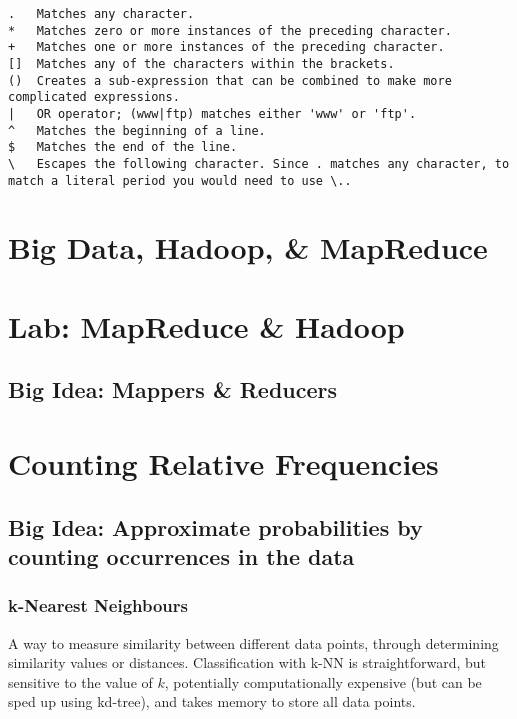 \documentclass[9pt,twocolumn]{article}
\begin{document}
\begin{lstlisting}
.   Matches any character.
*   Matches zero or more instances of the preceding character.
+   Matches one or more instances of the preceding character.
[]  Matches any of the characters within the brackets.
()  Creates a sub-expression that can be combined to make more complicated expressions.
|   OR operator; (www|ftp) matches either 'www' or 'ftp'.
^   Matches the beginning of a line.
$   Matches the end of the line.
\   Escapes the following character. Since . matches any character, to match a literal period you would need to use \..
\end{lstlisting}




\section{Big Data, Hadoop, \& MapReduce}
\section{Lab: MapReduce \& Hadoop}

\subsection*{Big Idea: Mappers \& Reducers}
\section{Counting Relative Frequencies}
\subsection*{Big Idea: Approximate probabilities by counting occurrences in the data}
\subsubsection*{k-Nearest Neighbours}
A way to measure similarity between different data points, through determining similarity values or distances. Classification with k-NN is straightforward, but sensitive to the value of $k$, potentially computationally expensive (but can be sped up using kd-tree), and takes memory to store all data points.
\end{document}
